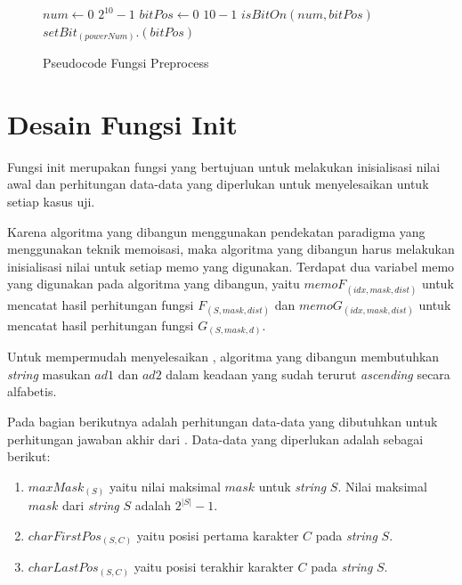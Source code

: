 \begin{figure}
	\begin{mdframed}
		\begin{codebox}
			\li \For $num \gets 0$ \To $2^{10} - 1$ \Do
			\li 	\For $bitPos \gets 0$ \To $10 - 1$ \Do 
			\li 		\If $isBitOn(num, bitPos)$ \Then
			\li				$setBit_{(powerNum)}$.$(bitPos)$
						\End
					\End
				\End
		\end{codebox}
	\end{mdframed}
	\caption{Pseudocode Fungsi Preprocess}
	\label{figure:pseudocode_fungsi_preprocess}
\end{figure}

\section{Desain Fungsi Init}
\label{sec:desain_fungsi_init}

Fungsi init merupakan fungsi yang bertujuan untuk melakukan inisialisasi nilai awal dan perhitungan data-data yang diperlukan untuk menyelesaikan \problem{} untuk setiap kasus uji.

Karena algoritma yang dibangun menggunakan pendekatan paradigma \dynamicprogramming{} yang menggunakan teknik memoisasi, maka algoritma yang dibangun harus melakukan inisialisasi nilai untuk setiap memo yang digunakan. Terdapat dua variabel memo yang digunakan pada algoritma yang dibangun, yaitu $memoF_{(idx, mask, dist)}$ untuk mencatat hasil perhitungan fungsi $F_{(S, mask, dist)}$ dan $memoG_{(idx, mask, dist)}$ untuk mencatat hasil perhitungan fungsi $G_{(S, mask, d)}$.

Untuk mempermudah menyelesaikan \problem{}, algoritma yang dibangun membutuhkan \textit{string} masukan $ad1$ dan $ad2$ dalam keadaan yang sudah terurut \textit{ascending} secara alfabetis.

Pada bagian berikutnya adalah perhitungan data-data yang dibutuhkan untuk perhitungan jawaban akhir dari \problem{}. Data-data yang diperlukan adalah sebagai berikut:
\begin{enumerate}
	\item $maxMask_{(S)}$ yaitu nilai maksimal $mask$ untuk \textit{string} $S$. Nilai maksimal $mask$ dari \textit{string} $S$ adalah $2^{|S|}-1$.
	\item $charFirstPos_{(S, C)}$ yaitu posisi pertama karakter $C$ pada \textit{string} $S$.
	\item $charLastPos_{(S, C)}$ yaitu posisi terakhir karakter $ C $ pada \textit{string} $ S $.
\end{enumerate}

